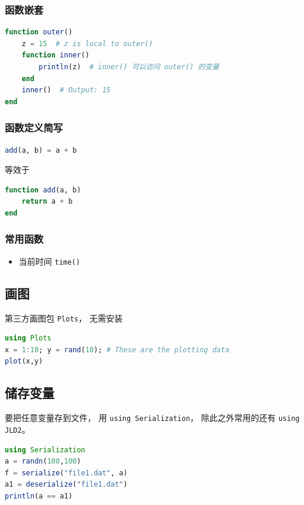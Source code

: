 \subsubsection{函数嵌套}
\begin{lstlisting}[language=julia]
function outer()
    z = 15  # z is local to outer()
    function inner()
        println(z)  # inner() 可以访问 outer() 的变量
    end
    inner()  # Output: 15
end
\end{lstlisting}

\subsubsection{函数定义简写}
\begin{lstlisting}[language=julia]
add(a, b) = a + b
\end{lstlisting}
等效于
\begin{lstlisting}[language=julia]
function add(a, b)
    return a + b
end
\end{lstlisting}

\subsubsection{常用函数}
\begin{itemize}
\item 当前时间 \verb`time()`
\end{itemize}



\subsection{画图}
第三方画图包 \verb`Plots`， 无需安装
\begin{lstlisting}[language=Julia]
using Plots
x = 1:10; y = rand(10); # These are the plotting data
plot(x,y)
\end{lstlisting}


\subsection{储存变量}
要把任意变量存到文件， 用 \verb`using Serialization`， 除此之外常用的还有 \verb`using JLD2`。
\begin{lstlisting}[language=julia]
using Serialization
a = randn(100,100)
f = serialize("file1.dat", a)
a1 = deserialize("file1.dat")
println(a == a1)
\end{lstlisting}

